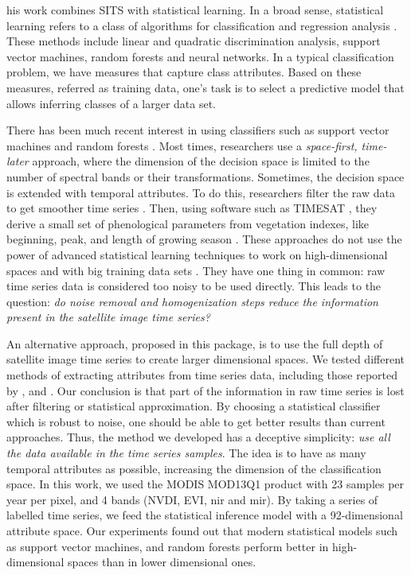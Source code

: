 \documentclass[article,shortnames]{jss}
\begin{document}
his work combines SITS with statistical learning. In a broad sense,
statistical learning refers to a class of algorithms for classification
and regression analysis \citep{Hastie2009}. These methods include linear
and quadratic discrimination analysis, support vector machines, random
forests and neural networks. In a typical classification problem, we
have measures that capture class attributes. Based on these measures,
referred as training data, one's task is to select a predictive model
that allows inferring classes of a larger data set.

There has been much recent interest in using classifiers such as support
vector machines \citep{Mountrakis2011} and random forests
\citep{Belgiu2016}. Most times, researchers use a
\emph{space-first, time-later} approach, where the dimension of the
decision space is limited to the number of spectral bands or their
transformations. Sometimes, the decision space is extended with temporal
attributes. To do this, researchers filter the raw data to get smoother
time series \citep{Brown2013, Kastens2017}. Then, using software such as
TIMESAT \citep{Jonsson2004}, they derive a small set of phenological
parameters from vegetation indexes, like beginning, peak, and length of
growing season \citep{Estel2015, Pelletier2016}. These approaches do not
use the power of advanced statistical learning techniques to work on
high-dimensional spaces and with big training data sets
\citep{James2013}. They have one thing in common: raw time series data
is considered too noisy to be used directly. This leads to the question:
\emph{do noise removal and homogenization steps reduce the information present in the satellite image time series?}

An alternative approach, proposed in this package, is to use the full
depth of satellite image time series to create larger dimensional
spaces. We tested different methods of extracting attributes from time
series data, including those reported by \cite{Maus2016},
\cite{Pelletier2016} and \cite{Kastens2017}. Our conclusion is that part
of the information in raw time series is lost after filtering or
statistical approximation. By choosing a statistical classifier which is
robust to noise, one should be able to get better results than current
approaches. Thus, the method we developed has a deceptive simplicity:
\emph{use all the data available in the time series samples}. The idea
is to have as many temporal attributes as possible, increasing the
dimension of the classification space. In this work, we used the MODIS
MOD13Q1 product with 23 samples per year per pixel, and 4 bands (NVDI,
EVI, nir and mir). By taking a series of labelled time series, we feed
the statistical inference model with a 92-dimensional attribute space.
Our experiments found out that modern statistical models such as support
vector machines, and random forests perform better in high-dimensional
spaces than in lower dimensional ones.
\end{document}
